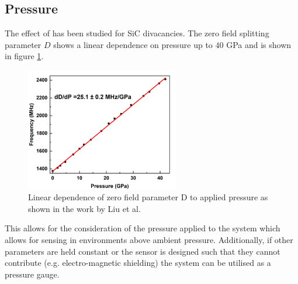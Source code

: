 \subsection{Pressure}
The effect of  has been studied for SiC divacancies. The zero field splitting parameter $D$ shows
a linear dependence on pressure up to $40$ GPa \cite{doi:10.1021/acs.nanolett.2c03378} and is shown in figure \ref{fig:pressure_d}.

\begin{figure}[H]
	\begin{center}
		\includegraphics[width=0.6\textwidth]{figures/PressureDependence.png}
	\end{center}
	\caption{Linear dependence of zero field parameter D to applied pressure as shown in the work by Liu et al.}\label{fig:pressure_d}
\end{figure}

This allows for the consideration of the pressure applied to the system which allows for sensing in environments above ambient pressure. Additionally, if other parameters are held constant or the sensor is designed such that they cannot contribute (e.g. electro-magnetic shielding) the system can be utilised as a pressure gauge.


